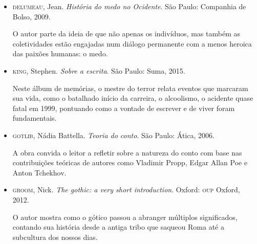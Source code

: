 \documentclass[12pt]{extarticle}
\begin{document}
\begin{itemize}
\item\textsc{delumeau}, Jean. \textit{História do medo no Ocidente}. São Paulo:
Companhia de Bolso, 2009.

O autor parte da ideia de que não apenas os indivíduos, mas também as
coletividades estão engajadas num diálogo permanente com a menos heroica
das paixões humanas: o medo.

\item\textsc{king}, Stephen. \textit{Sobre a escrita}. São Paulo: Suma, 2015.

Neste álbum de memórias, o mestre do terror relata eventos que marcaram
sua vida, como o batalhado início da carreira, o alcoolismo, o acidente
quase fatal em 1999, pontuando como a vontade de escrever e de viver
foram fundamentais.

\item\textsc{gotlib}, Nádia Battella. \textit{Teoria do conto}. São Paulo: Ática, 2006.

A obra convida o leitor a refletir sobre a natureza do conto com base
nas contribuições teóricas de autores como Vladimir Propp, Edgar Allan
Poe e Anton Tchekhov.

\item\textsc{groom}, Nick. \textit{The gothic: a very short introduction}. Oxford: \textsc{oup} Oxford, 2012.

O autor mostra como o gótico passou a abranger múltiplos significados,
contando sua história desde a antiga tribo que saqueou Roma até a
subcultura dos nossos dias.
\end{itemize}
\end{document}
